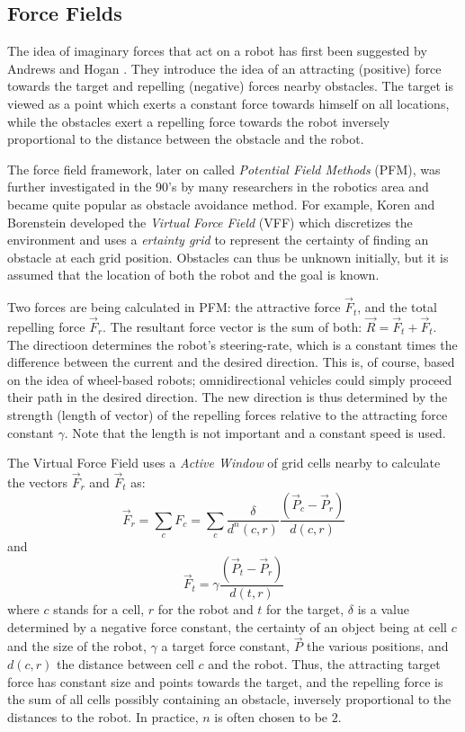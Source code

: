 \documentclass[11pt]{article}
\begin{document}
\subsection{Force Fields}

The idea of imaginary forces that act on a robot has first been suggested by Andrews and Hogan \cite{andrews83}. They introduce the idea of an attracting (positive) force towards the target and repelling (negative) forces nearby obstacles. The target is viewed as a point which exerts a constant force towards himself on all locations, while the obstacles exert a repelling force towards the robot inversely proportional to the distance between the obstacle and the robot.


The force field framework, later on called \emph{Potential Field Methods} (PFM), was further investigated in the 90's by many researchers in the robotics area and became quite popular as obstacle avoidance method. For example, Koren and Borenstein \cite{koren89} developed the \emph{Virtual Force Field} (VFF) which discretizes the environment and uses a \emph{ertainty grid} to represent the certainty of finding an obstacle at each grid position. Obstacles can thus be unknown initially, but it is assumed that the location of both the robot and the goal is known.

Two forces are being calculated in PFM: the attractive force $\vec{F}_t$, and the total repelling force $\vec{F}_r$. The resultant force vector is the sum of both: $\vec{R} = \vec{F}_t + \vec{F}_t$. The directioon determines the robot's steering-rate, which is a constant times the difference between the current and the desired direction. This is, of course, based on the idea of wheel-based robots; omnidirectional vehicles could simply proceed their path in the desired direction. The new direction is thus determined by the strength (length of vector) of the repelling forces relative to the attracting force constant $\gamma$. Note that the length is not important and a constant speed is used.

The Virtual Force Field uses a \emph{Active Window} of grid cells nearby to calculate the vectors $\vec{F}_r$ and $\vec{F}_t$ as:
  \[ \vec{F}_r = \sum_{c} F_{c} = \sum_{c} \frac{\delta}{d^n(c, r)} \frac{(\vec{P}_c - \vec{P}_r)}{ d(c, r) } \]
and
  \[ \vec{F}_t = \gamma \frac{(\vec{P}_t - \vec{P}_r)}{ d(t, r) } \]
where $c$ stands for a cell, $r$ for the robot and $t$ for the target, $\delta$ is a value determined by a negative force constant, the certainty of an object being at cell $c$ and the size of the robot, $\gamma$ a target force constant, $\vec{P}$ the various positions, and $d(c, r)$ the distance between cell $c$ and the robot. Thus, the attracting target force has constant size and points towards the target, and the repelling force is the sum of all cells possibly containing an obstacle, inversely proportional to the distances to the robot. In practice, $n$ is often chosen to be $2$.
\end{document}
